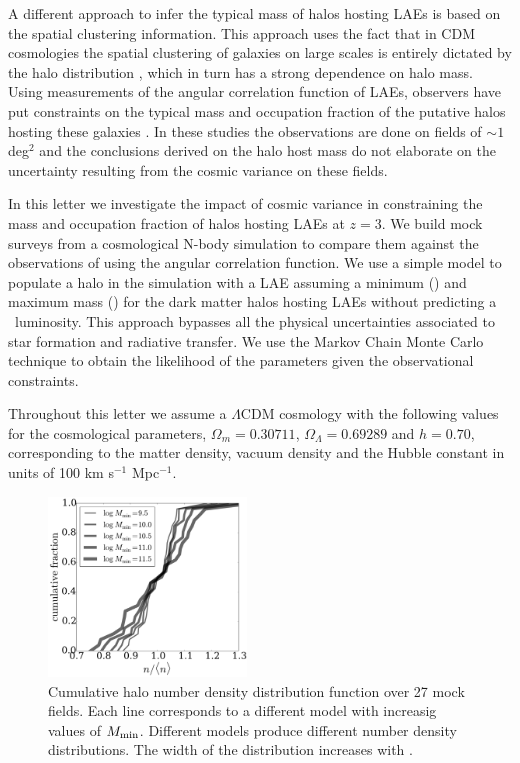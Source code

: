 \documentclass{emulateapj}
\newcommand{\ly}{{\ifmmode{{\rm Ly}\alpha}\else{Ly$\alpha$}\fi}}
\newcommand{\mmin}{{\ifmmode{{M_{\rm min}}}\else{${M_{\rm min}}$}\fi}}
\newcommand{\mmax}{{\ifmmode{{M_{\rm max}}}\else{${M_{\rm max}}$}\fi}}
\begin{document}
A different approach to infer the typical mass of halos hosting
LAEs is based on the spatial clustering information. 
This approach uses the fact
that in CDM cosmologies the spatial clustering of galaxies on large
scales is entirely dictated by the halo distribution
\citep{Colberg00}, which in turn has a strong dependence on halo
mass. 
Using measurements of the angular correlation function of LAEs,
observers have put constraints on the typical mass and occupation
fraction of the putative halos hosting these galaxies
\citep{Hayashino2004,Gawiser07,Nilsson2007,Ouchi2010,Bielby16}. 
In these studies the observations are done on fields of $\sim 1$ deg$^{2}$ and
the conclusions derived on the halo host mass do not elaborate on the
uncertainty resulting from the cosmic variance on these fields. 

In this letter we investigate the impact of cosmic variance in
constraining the mass and occupation fraction of halos hosting LAEs at $z=3$.
We build mock surveys from a cosmological N-body simulation to compare them
against the observations of \cite{Bielby16} using the angular
correlation function.  
We use a simple model to populate a halo in the simulation with a LAE   
assuming a minimum (\mmin) and maximum mass (\mmax) for the dark
matter halos hosting LAEs without predicting a \ly\  luminosity.  
This approach bypasses all the physical uncertainties associated to
star formation and radiative transfer. 
We use the Markov Chain Monte Carlo technique to obtain the likelihood
of the parameters given the observational constraints. 

Throughout this letter we assume a $\Lambda$CDM cosmology with the
following values for the cosmological parameters, $\Omega_{m}=0.30711$,
$\Omega_{\Lambda}=0.69289$ and $h=0.70$, corresponding to the matter
density, vacuum density and the Hubble constant in units of 100 km
s$^{-1}$ Mpc$^{-1}$. 


\begin{figure}
\includegraphics[width=0.47\textwidth]{fig1.pdf}
\caption{Cumulative halo number density distribution function over
  27 mock fields. Each line corresponds to a
  different model with increasig values of $M_{\rm min}$. 
  Different models produce different number density distributions. The
width of the distribution increases with \mmin. } 
\label{fig:cosmicv0}
\end{figure}
\end{document}
